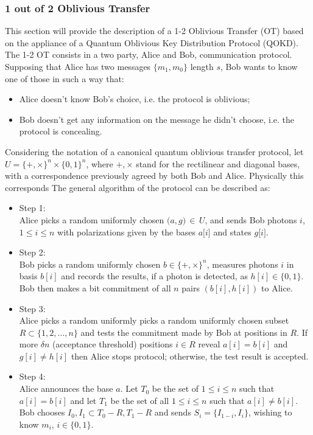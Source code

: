 \begin{refsection}
	\subsubsection{1 out of 2 Oblivious Transfer}
	This section will provide the description of a 1-2 Oblivious Transfer (OT) based on the appliance of a Quantum Oblivious Key Distribution Protocol (QOKD). The 1-2 OT consists in a two party, Alice and Bob, communication protocol. Supposing that Alice has two messages $\{m_1,m_0\}$ length $s$, Bob wants to know one of those in such a way that:
	\begin{itemize}
		\item Alice doesn't know Bob's choice, i.e. the protocol is oblivious;
		\item Bob doesn't get any information on the message he didn't choose, i.e. the protocol is concealing.
	\end{itemize}
	Considering the notation of a canonical quantum oblivious transfer protocol, let $U=\{+,\times\}^n\times\{0,1\}^n$, where $+, \times$ stand for the rectilinear and diagonal bases, with a correspondence previously agreed by both Bob and Alice. Physically this corresponds   The general algorithm of the protocol can be described as:
	\begin{itemize}
		\item Step 1:\\
		Alice picks a random uniformly chosen $\big(a,g\big)\,\in\,U$, and sends Bob photons $i$, $1\leq i \leq n$ with polarizations given by the bases $a\big[i\big]$ and states $g\big[i\big]$.
		\item Step 2:\\
		Bob picks a random uniformly chosen $b\in\{+,\times\}^n$, measures photons $i$ in basis $b\left[i\right]$ and records the results, if a photon is detected, as $h\left[i\right]\in\{0,1\}$. Bob then makes a bit commitment of all $n$ pairs $\left(b\left[i\right],h\left[i\right]\right)$ to Alice.
		\item Step 3:\\
		Alice picks a random uniformly picks a random uniformly chosen subset $R\subset\{1,2,...,n\}$ and tests the commitment made by Bob at positions in $R$. If more $\delta n$ (acceptance threshold) positions $i\in R$ reveal $a\left[i\right]=b\left[i\right]$ and $g\left[i\right]\neq h\left[i\right]$ then Alice stops protocol; otherwise, the test result is accepted.
		\item Step 4:\\
		Alice announces the base $a$. Let $T_0$ be the set of $1\leq i \leq n$ such that $a\left[i\right]=b\left[i\right]$ and let $T_1$ be the set of all $1\leq i \leq n$ such that $a\left[i\right]\ne b\left[i\right]$. Bob chooses $I_0,I_1\subset T_0-R, T_1-R$ and sends $S_i=\{I_{1-i},I_i\}$, wishing to know $m_i$, $i\in\{0,1\}$.

\end{itemize}
\end{refsection}
